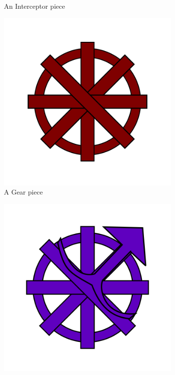 \documentclass{l4proj}
\begin{document}
\begin{figure}
\begin{subfigure}[b]{0.20\textwidth}
        \caption{An Interceptor piece \\}
        \label{fig:interceptor}
    \end{subfigure}
    \begin{subfigure}[b]{0.20\textwidth}
        \includegraphics[width=\textwidth]{images/Gear.png}
        \caption{A Gear piece \\}
        \label{fig:Gear}
    \end{subfigure}
    \begin{subfigure}[b]{0.20\textwidth}
        \includegraphics[width=\textwidth]{images/Gear-bit.png}

\end{subfigure}
\end{figure}
\end{document}
